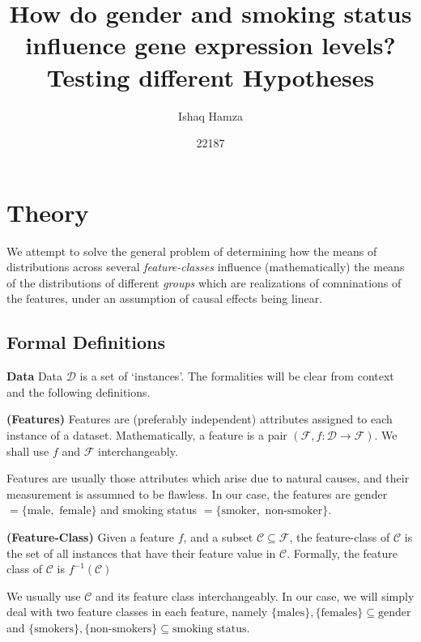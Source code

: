 \documentclass{article}
\title{How do gender and smoking status influence gene expression levels?\\
\large{Testing different Hypotheses}}
\author{\LARGE{Ishaq Hamza}}
\date{22187}
\begin{document}
\maketitle

\section{Theory}
We attempt to solve the general problem of determining how the means of distributions across several \textit{feature-classes} influence (mathematically) the means of the distributions of different \textit{groups} which are realizations of comninations of the features, under an assumption of causal effects being linear.

\subsection{Formal Definitions}
\begin{definition}
    \textbf{Data} Data $\mathcal{D}$ is a set of `instances'. The formalities will be clear from context and the following definitions.
\end{definition}

\begin{definition}
    \textbf{(Features)} Features are (preferably independent) attributes assigned to each instance of a dataset. Mathematically, a feature is a pair $(\mathcal{F}, f: \mathcal{D} \to \mathcal{F})$. We shall use $f$ and $\mathcal{F}$ interchangeably.
\end{definition}
\begin{remark}
    Features are usually those attributes which arise due to natural causes, and their measurement is assumned to be flawless. In our case, the features are gender $= \{\text{male}, \text{ female}\}$ and smoking status $= \{\text{smoker}, \text{ non-smoker}\}$.
\end{remark}

\begin{definition}
    \textbf{(Feature-Class)} Given a feature $f$, and a subset $\mathcal{C} \subseteq \mathcal{F}$, the feature-class of $\mathcal{C}$ is the set of all instances that have their feature value in $\mathcal{C}$. Formally, the feature class of $\mathcal{C}$ is $f^{-1}(\mathcal{C})$
\end{definition}
\begin{remark}
    We usually use $\mathcal{C}$ and its feature class interchangeably. In our case, we will simply deal with two feature classes in each feature, namely $\{\text{males}\}, \{\text{females}\} \subseteq \text{gender}$ and $\{\text{smokers}\}, \{\text{non-smokers}\} \subseteq \text{smoking status}$.
\end{remark}
\end{document}
